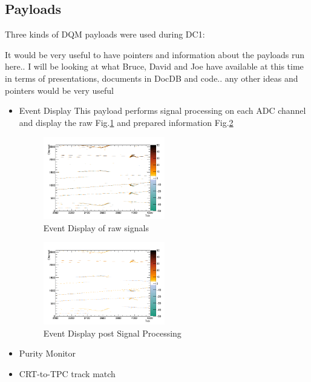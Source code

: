 \documentclass[pdftex,12pt,letter]{article}
\begin{document}
\subsection{Payloads}
Three kinds of DQM payloads were used during DC1:

 \color{red} It would be very useful to have pointers and information about the payloads run here.. I will be looking at what Bruce, David and Joe have available at this time in terms of presentations, documents in DocDB and code.. any other ideas and  pointers would be very useful
 \color {black}
 
\begin{itemize}
\item Event Display
This payload performs signal processing on each ADC channel and display the raw Fig.\ref{fig:adcraw} and prepared information 
 Fig.\ref{fig:adcprep}

\begin{figure}[tbh]
  \centering
  \includegraphics[width=0.5\textwidth]{./ReportImages/adcraw_evt1661_ch0-2559.png}
  \caption{Event Display of raw signals}
  \label{fig:adcraw}
\end{figure}


\begin{figure}[tbh]
  \centering
  \includegraphics[width=0.5\textwidth]{./ReportImages/adcprep_evt1661_ch0-2559.png}
  \caption{Event Display post Signal Processing}
  \label{fig:adcprep}
\end{figure}

\item Purity Monitor
\item CRT-to-TPC track match
\end{itemize}
 
\end{document}
